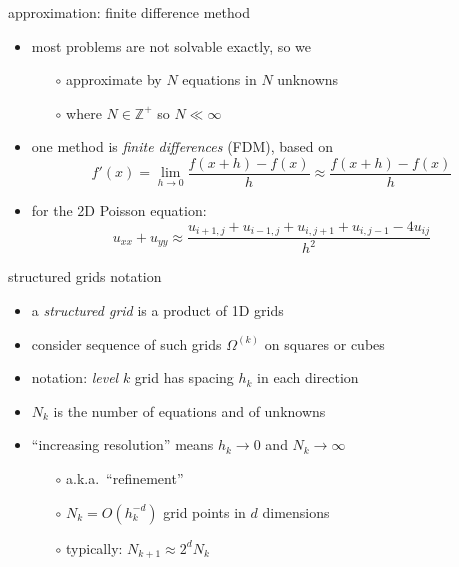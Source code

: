 \documentclass[hide notes,intlimits,usenames,dvipsnames]{beamer}
\newcommand{\ZZ}{\mathbb{Z}}
\begin{document}
\begin{frame}{approximation: finite difference method}
\begin{itemize}
\item most problems are not solvable exactly, so we
	\begin{itemize}
	\item[$\circ$] \alert{approximate by $N$ equations in $N$ unknowns}
	\item[$\circ$] where $N\in\ZZ^+$ so $N \ll \infty$
	\end{itemize}
\item one method is \emph{finite differences} (FDM), based on
	    $$f'(x) = \lim_{h \to 0} \frac{f(x+h)-f(x)}{h} \approx \frac{f(x+h)-f(x)}{h}$$
\item for the 2D Poisson equation:
	    $$u_{xx}+u_{yy} \approx \frac{u_{i+1,j} + u_{i-1,j} + u_{i,j+1} + u_{i,j-1} - 4 u_{ij}}{h^2}$$
\end{itemize}
\end{frame}


\begin{frame}{structured grids notation}
\begin{itemize}
\item a \emph{structured grid} is a product of 1D grids
\item consider sequence of such grids $\Omega^{(k)}$ on squares or cubes
\item notation: \emph{level} $k$ grid has spacing $h_k$ in each direction

\bigskip
\begin{tikzpicture}[scale=1.6]

\end{tikzpicture}

\medskip
\item $N_k$ is the number of equations and of unknowns
\item ``increasing resolution'' means $h_k \to 0$ and $N_k \to \infty$
	\begin{itemize}
	\item[$\circ$] a.k.a.~``refinement''
    \item[$\circ$] $N_k = O(h_k^{-d})$ grid points in $d$ dimensions
	\item[$\circ$] typically: $N_{k+1} \approx 2^d N_k$
	\end{itemize}
\end{itemize}
\end{frame}
\end{document}
